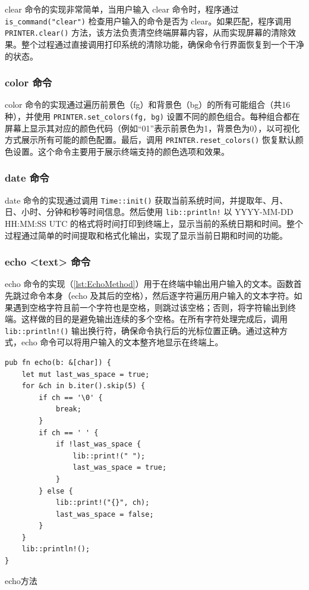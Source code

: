 clear 命令的实现非常简单，当用户输入 clear 命令时，程序通过 \texttt{is\_command("clear")} 检查用户输入的命令是否为 clear。如果匹配，程序调用 \texttt{PRINTER.clear()} 方法，该方法负责清空终端屏幕内容，从而实现屏幕的清除效果。整个过程通过直接调用打印系统的清除功能，确保命令行界面恢复到一个干净的状态。

\subsubsection{color 命令}

color 命令的实现通过遍历前景色（fg）和背景色（bg）的所有可能组合（共16种），并使用 \texttt{PRINTER.set\_colors(fg, bg)} 设置不同的颜色组合。每种组合都在屏幕上显示其对应的颜色代码（例如“01”表示前景色为1，背景色为0），以可视化方式展示所有可能的颜色配置。最后，调用 \texttt{PRINTER.reset\_colors()} 恢复默认颜色设置。这个命令主要用于展示终端支持的颜色选项和效果。

\subsubsection{date 命令}

date 命令的实现通过调用 \texttt{Time::init()} 获取当前系统时间，并提取年、月、日、小时、分钟和秒等时间信息。然后使用 \texttt{lib::println!} 以 YYYY-MM-DD HH:MM:SS UTC 的格式将时间打印到终端上，显示当前的系统日期和时间。整个过程通过简单的时间提取和格式化输出，实现了显示当前日期和时间的功能。

\subsubsection{echo <text> 命令}

echo 命令的实现（\cref{lst:EchoMethod}）用于在终端中输出用户输入的文本。函数首先跳过命令本身（echo 及其后的空格），然后逐字符遍历用户输入的文本字符。如果遇到空格字符且前一个字符也是空格，则跳过该空格；否则，将字符输出到终端。这样做的目的是避免输出连续的多个空格。在所有字符处理完成后，调用 \texttt{lib::println!()} 输出换行符，确保命令执行后的光标位置正确。通过这种方式，echo 命令可以将用户输入的文本整齐地显示在终端上。

\begin{listing}[htbp]
    \begin{verbatim}
pub fn echo(b: &[char]) {
    let mut last_was_space = true;
    for &ch in b.iter().skip(5) {
        if ch == '\0' {
            break;
        }
        if ch == ' ' {
            if !last_was_space {
                lib::print!(" ");
                last_was_space = true;
            }
        } else {
            lib::print!("{}", ch);
            last_was_space = false;
        }
    }
    lib::println!();
}
    \end{verbatim}
    \caption{echo方法}\label{lst:EchoMethod}
\end{listing}

